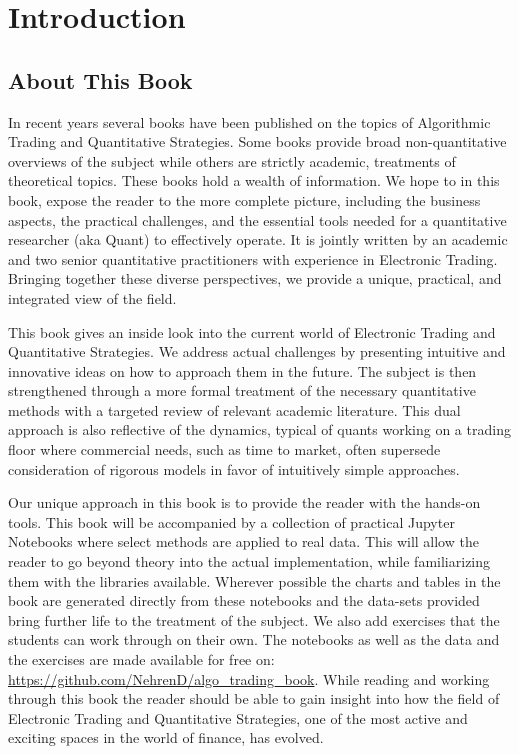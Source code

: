 \chapter{Introduction}\label{chap:ch_intro}
\section{About This Book}

In recent years several books have been published  on the topics of Algorithmic Trading and Quantitative Strategies. Some books provide broad non-quantitative overviews of the subject while others are strictly academic, treatments of theoretical topics. These books hold a wealth of  information. We hope to in this book, expose the reader to the more complete picture, including the business aspects, the practical challenges, and the essential tools needed for a quantitative researcher (aka Quant) to effectively operate. It is jointly written by an academic and two senior quantitative practitioners with experience in Electronic Trading. Bringing together these diverse perspectives, we provide a unique, practical, and integrated view of the field.


This book gives an inside look into the current world of Electronic Trading and Quantitative Strategies. We address actual challenges by presenting intuitive and innovative ideas on how to approach them in the future. The subject is then strengthened through a more formal treatment of the necessary quantitative methods with a targeted review of relevant academic literature. This dual approach is also reflective of the dynamics, typical of quants working on a trading floor where commercial needs, such as time to market, often supersede consideration of rigorous models in favor of intuitively simple approaches. 


Our unique approach in this book is to provide the reader with the hands-on tools. This book will be accompanied by a collection of practical Jupyter Notebooks where select methods are applied to real data. This will allow the reader to go beyond theory into the actual implementation, while familiarizing them with the libraries available. Wherever possible the charts and tables in the book are generated directly from these notebooks and the data-sets provided bring further life to the treatment of the subject. We also add exercises that the students can work through on their own. The notebooks as well as the data and the exercises are made  available for free on: \url{https://github.com/NehrenD/algo_trading_book}. While reading and working through this book the reader should be able to gain insight into how the field of Electronic Trading and Quantitative Strategies, one of the most active and exciting spaces in the world of finance, has evolved.



